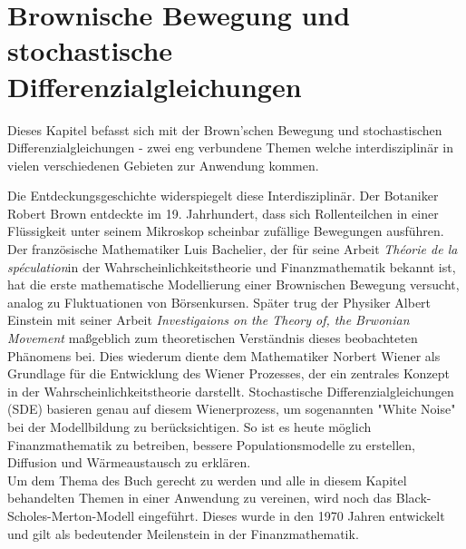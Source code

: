 %
%
%
%
\chapter{Brownische Bewegung und stochastische Differenzialgleichungen\label{chapter:brown}}
\begin{refsection}


Dieses Kapitel befasst sich mit der Brown'schen Bewegung und stochastischen Differenzialgleichungen - zwei eng verbundene Themen welche interdisziplinär in vielen verschiedenen Gebieten zur Anwendung kommen.

Die Entdeckungsgeschichte widerspiegelt diese Interdisziplinär. Der Botaniker Robert Brown entdeckte im 19. Jahrhundert, dass sich Rollenteilchen in einer Flüssigkeit unter seinem Mikroskop scheinbar zufällige Bewegungen ausführen. Der französische Mathematiker Luis Bachelier, der für seine Arbeit \glqq \textit{Théorie de la spéculation}\glqq{}in der Wahrscheinlichkeitstheorie und Finanzmathematik bekannt ist, hat die erste mathematische Modellierung einer Brownischen Bewegung versucht, analog zu Fluktuationen von Börsenkursen. Später trug der Physiker Albert Einstein mit seiner Arbeit \glqq \textit{Investigaions on the Theory of, the Brwonian Movement}\glqq{} maßgeblich zum theoretischen Verständnis dieses beobachteten Phänomens bei. Dies wiederum diente dem Mathematiker Norbert Wiener als Grundlage für die Entwicklung des Wiener Prozesses, der ein zentrales Konzept in der Wahrscheinlichkeitstheorie darstellt. Stochastische Differenzialgleichungen (SDE) basieren genau auf diesem Wienerprozess, um sogenannten "White Noise" bei der Modellbildung zu berücksichtigen. So ist es heute möglich Finanzmathematik zu betreiben, bessere Populationsmodelle zu erstellen, Diffusion und Wärmeaustausch zu erklären.\\

Um dem Thema des Buch gerecht zu werden und alle in diesem Kapitel behandelten Themen in einer Anwendung zu vereinen, wird noch das Black-Scholes-Merton-Modell eingeführt. Dieses wurde in den 1970 Jahren entwickelt und gilt als bedeutender Meilenstein in der Finanzmathematik.







\printbibliography[heading=subbibliography]
\end{refsection}
